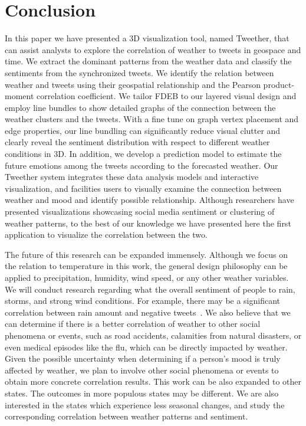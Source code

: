 \section{Conclusion}

In this paper we have presented a 3D visualization tool, named Tweether, that can assist analysts to explore the correlation of weather to tweets in geospace and time. We extract the dominant patterns from the weather data and classify the sentiments from the synchronized tweets. We identify the relation between weather and tweets using their geospatial relationship and the Pearson product-moment correlation coefficient. We tailor FDEB to our layered visual design and employ line bundles to show detailed graphs of the connection between the weather clusters and the tweets. With a fine tune on graph vertex placement and edge properties, our line bundling can significantly reduce visual clutter and clearly reveal the sentiment distribution with respect to different weather conditions in 3D. In addition, we develop a prediction model to estimate the future emotions among the tweets according to the forecasted weather. Our Tweether system integrates these data analysis models and interactive visualization, and facilities users to visually examine the connection between weather and mood and identify possible relationship.
%
Although researchers have presented visualizations showcasing social media sentiment or clustering of weather patterns, to the best of our knowledge we have presented here the first application to visualize the correlation between the two.


The future of this research can be expanded immensely. Although we focus on the relation to temperature in this work, the general design philosophy can be applied to precipitation, humidity, wind speed, or any other weather variables.
We will conduct research regarding what the overall sentiment of people to rain, storms, and strong wind conditions. For example, there may be a significant correlation between rain amount and negative tweets~\cite{hannak2012tweetin}. We also believe that we can determine if there is a better correlation of weather to other social phenomena or events, such as road accidents, calamities from natural disasters, or even medical episodes like the flu, which can be directly impacted by weather. Given the possible uncertainty when determining if a person's mood is truly affected by weather, we plan to involve other social phenomena or events to obtain more concrete correlation results.
%
This work can be also expanded to other states. The outcomes in more populous states may be different. We are also interested in the states which experience less seasonal changes, and study the corresponding correlation between weather patterns and sentiment.

